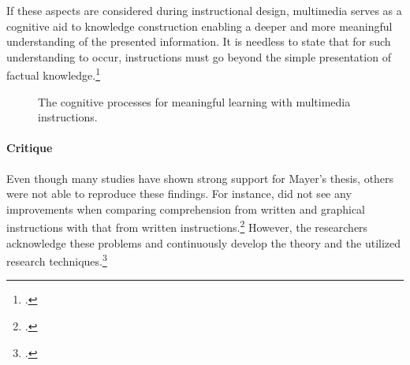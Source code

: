 If these aspects are considered during instructional design, multimedia serves as a cognitive aid to knowledge construction enabling a deeper and more meaningful understanding of the presented information. It is needless to state that for such understanding to occur, instructions must go beyond the simple presentation of factual knowledge.\footcites[Cf.][p.229]{MayerRotemeaningfullearning2002}

\begin{figure}[!htb]
    \centering
    
    \caption[The cognitive processes for meaningful learning with multimedia instructions.]{The cognitive processes for meaningful learning with multimedia instructions.\protect\footnotemark}
    \label{fig:CTML_process}
\end{figure}


\paragraph{Critique} Even though many studies have shown strong support for Mayer's thesis, others were not able to reproduce these findings. For instance, \cite{RaschInteractivenoninteractivepictures2009} did not see any improvements when comparing comprehension from written and graphical instructions with that from written instructions.\footcites[Cf.][]{RaschInteractivenoninteractivepictures2009} However, the researchers acknowledge these problems and continuously develop the theory and the utilized research techniques.\footcites[Cf.][p.52]{SordenCognitiveTheoryMultimedia2012} 

